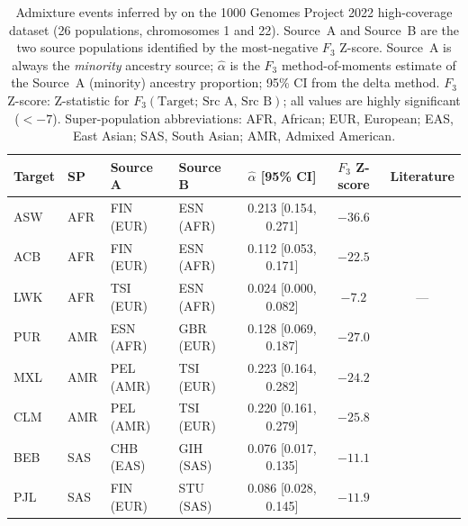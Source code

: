 \begin{table}[htbp]
\centering
\caption{Admixture events inferred by \hapgraph{} on the 1000 Genomes Project
2022 high-coverage dataset (26 populations, chromosomes 1 and 22).
Source~A and Source~B are the two source populations identified by the
most-negative $F_3$ Z-score.
Source~A is always the \emph{minority} ancestry source; $\hat{\alpha}$ is the
$F_3$ method-of-moments estimate of the Source~A (minority) ancestry
proportion; 95\% CI from the delta method.
$F_3$ Z-score: Z-statistic for $F_3(\text{Target};\,\text{Src A},\,\text{Src B})$;
all values are highly significant ($< -7$).
Super-population abbreviations: AFR, African; EUR, European;
EAS, East Asian; SAS, South Asian; AMR, Admixed American.}
\label{tab:1kgp}
\small
\begin{tabular}{llllccc}
\toprule
Target & SP & Source A & Source B & $\hat{\alpha}$ [95\% CI] & $F_3$ Z-score & Literature \\
\midrule
ASW & AFR & FIN (EUR) & ESN (AFR) & 0.213 [0.154, 0.271] & $-36.6$ & \citet{Bryc2015} \\
ACB & AFR & FIN (EUR) & ESN (AFR) & 0.112 [0.053, 0.171] & $-22.5$ & \citet{Bryc2015} \\
LWK & AFR & TSI (EUR) & ESN (AFR) & 0.024 [0.000, 0.082] & $-7.2$ & --- \\
PUR & AMR & ESN (AFR) & GBR (EUR) & 0.128 [0.069, 0.187] & $-27.0$ & \citet{Moreno-Estrada2013} \\
MXL & AMR & PEL (AMR) & TSI (EUR) & 0.223 [0.164, 0.282] & $-24.2$ & \citet{Moreno-Estrada2013} \\
CLM & AMR & PEL (AMR) & TSI (EUR) & 0.220 [0.161, 0.279] & $-25.8$ & \citet{Moreno-Estrada2013} \\
BEB & SAS & CHB (EAS) & GIH (SAS) & 0.076 [0.017, 0.135] & $-11.1$ & \citet{Moorjani2013} \\
PJL & SAS & FIN (EUR) & STU (SAS) & 0.086 [0.028, 0.145] & $-11.9$ & \citet{Moorjani2013} \\
\bottomrule
\end{tabular}
\end{table}
